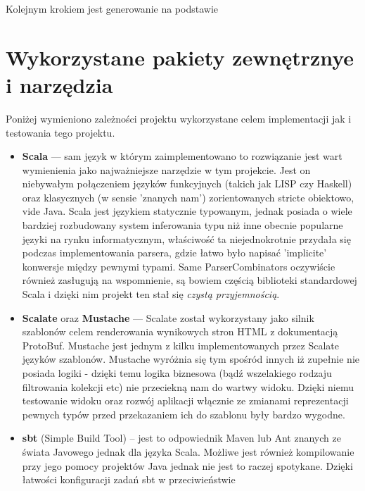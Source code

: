 \documentclass[a4paper]{article}
\begin{document}
Kolejnym krokiem jest generowanie na podstawie 


\section{Wykorzystane pakiety zewnętrznye i narzędzia}
Poniżej wymieniono zależności projektu wykorzystane celem implementacji jak i testowania tego projektu.

\begin{itemize}
 \item \textbf{Scala} --- sam język w którym zaimplementowano to rozwiązanie jest wart wymienienia 
                        jako najważniejsze narzędzie w tym projekcie. Jest on niebywałym połączeniem języków funkcyjnych (takich jak LISP czy Haskell)
                        oraz klasycznych (w sensie 'znanych nam') zorientowanych stricte obiektowo, vide Java. Scala jest językiem statycznie typowanym,
                        jednak posiada o wiele bardziej rozbudowany system inferowania typu niż inne obecnie popularne języki na rynku informatycznym,
                        właściwość ta niejednokrotnie przydała się podczas implementowania parsera, gdzie łatwo było napisać 'implicite' konwersje między pewnymi typami.
                        Same ParserCombinators oczywiście również zasługują na wspomnienie, są bowiem częścią biblioteki standardowej Scala i dzięki nim projekt ten stał się \textit{czystą przyjemnością}.
 \item \textbf{Scalate} oraz \textbf{Mustache} --- Scalate został wykorzystany jako silnik szablonów celem renderowania wynikowych stron HTML z dokumentacją ProtoBuf.
                                                   Mustache jest jednym z kilku implementowanych przez Scalate języków szablonów. Mustache wyróżnia się tym spośród innych
                                                   iż zupełnie nie posiada logiki - dzięki temu logika biznesowa (bądź wszelakiego rodzaju filtrowania kolekcji etc)
                                                   nie przeciekną nam do wartwy widoku. Dzięki niemu testowanie widoku oraz rozwój aplikacji włącznie ze zmianami reprezentacji
                                                   pewnych typów przed przekazaniem ich do szablonu były bardzo wygodne.
 \item \textbf{sbt} (Simple Build Tool) -- jest to odpowiednik Maven lub Ant znanych ze świata Javowego jednak dla języka Scala. Możliwe jest również kompilowanie
                                           przy jego pomocy projektów Java jednak nie jest to raczej spotykane. Dzięki łatwości konfiguracji zadań sbt w przeciwieństwie

\end{itemize}
\end{document}
